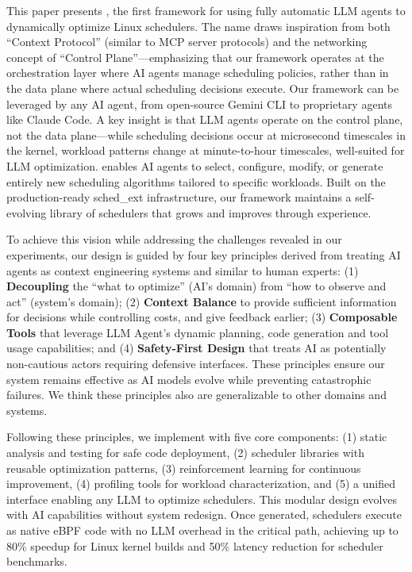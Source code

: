 This paper presents \sys, the first framework for using fully automatic LLM agents to dynamically optimize Linux schedulers. The name \sys draws inspiration from both ``Context Protocol'' (similar to MCP server protocols) and the networking concept of ``Control Plane''—emphasizing that our framework operates at the orchestration layer where AI agents manage scheduling policies, rather than in the data plane where actual scheduling decisions execute. Our framework can be leveraged by any AI agent, from open-source Gemini CLI to proprietary agents like Claude Code. A key insight is that LLM agents operate on the control plane, not the data plane—while scheduling decisions occur at microsecond timescales in the kernel, workload patterns change at minute-to-hour timescales, well-suited for LLM optimization. \sys enables AI agents to select, configure, modify, or generate entirely new scheduling algorithms tailored to specific workloads. Built on the production-ready sched\_ext infrastructure, our framework maintains a self-evolving library of schedulers that grows and improves through experience.

To achieve this vision while addressing the challenges revealed in our experiments, our design is guided by four key principles derived from treating AI agents as context engineering systems and similar to human experts: (1) \textbf{Decoupling} the ``what to optimize'' (AI's domain) from ``how to observe and act'' (system's domain); (2) \textbf{Context Balance} to provide sufficient information for decisions while controlling costs, and give feedback earlier; (3) \textbf{Composable Tools} that leverage LLM Agent's dynamic planning, code generation and tool usage capabilities; and (4) \textbf{Safety-First Design} that treats AI as potentially non-cautious actors requiring defensive interfaces. These principles ensure our system remains effective as AI models evolve while preventing catastrophic failures. We think these principles also are generalizable to other domains and systems.

Following these principles, we implement \sys with five core components: (1) static analysis and testing for safe code deployment, (2) scheduler libraries with reusable optimization patterns, (3) reinforcement learning for continuous improvement, (4) profiling tools for workload characterization, and (5) a unified interface enabling any LLM to optimize schedulers. This modular design evolves with AI capabilities without system redesign. Once generated, schedulers execute as native eBPF code with no LLM overhead in the critical path, achieving up to 80\% speedup for Linux kernel builds and 50\% latency reduction for scheduler benchmarks.

